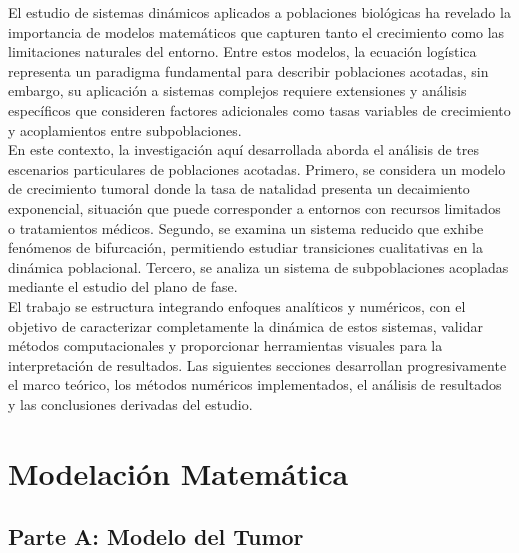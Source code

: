 \documentclass[a4paper,10pt,twocolumn]{article}
\begin{document}
El estudio de sistemas dinámicos aplicados a poblaciones biológicas ha revelado la importancia de modelos matemáticos que capturen tanto el crecimiento como las limitaciones naturales del entorno. Entre estos modelos, la ecuación logística representa un paradigma fundamental para describir poblaciones acotadas, sin embargo, su aplicación a sistemas complejos requiere extensiones y análisis específicos que consideren factores adicionales como tasas variables de crecimiento y acoplamientos entre subpoblaciones.
\\
\indent En este contexto, la investigación aquí desarrollada aborda el análisis de tres escenarios particulares de poblaciones acotadas. Primero, se considera un modelo de crecimiento tumoral donde la tasa de natalidad presenta un decaimiento exponencial, situación que puede corresponder a entornos con recursos limitados o tratamientos médicos. Segundo, se examina un sistema reducido que exhibe fenómenos de bifurcación, permitiendo estudiar transiciones cualitativas en la dinámica poblacional. Tercero, se analiza un sistema de subpoblaciones acopladas mediante el estudio del plano de fase.
\\
\indent El trabajo se estructura integrando enfoques analíticos y numéricos, con el objetivo de caracterizar completamente la dinámica de estos sistemas, validar métodos computacionales y proporcionar herramientas visuales para la interpretación de resultados. Las siguientes secciones desarrollan progresivamente el marco teórico, los métodos numéricos implementados, el análisis de resultados y las conclusiones derivadas del estudio.
\section{Modelación Matemática}\label{sec:modelacion}


\subsection{Parte A: Modelo del Tumor}\label{subsec:parte-a}

\end{document}
